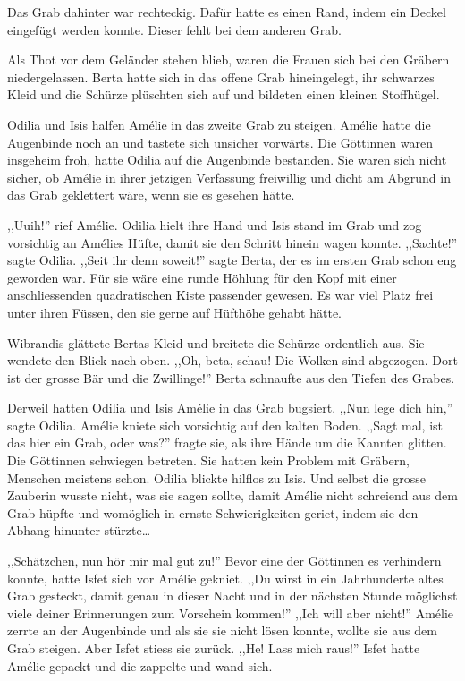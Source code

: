 \documentclass[11pt,titlepage,a5paper]{book}
\begin{document}
Das Grab dahinter war rechteckig. Dafür hatte es einen Rand, indem ein Deckel eingefügt werden konnte. Dieser fehlt bei dem anderen Grab.

Als Thot vor dem Geländer stehen blieb, waren die Frauen sich bei den Gräbern niedergelassen. Berta hatte sich in das offene Grab hineingelegt, ihr schwarzes Kleid und die Schürze plüschten sich auf und bildeten einen kleinen Stoffhügel.

Odilia und Isis halfen Amélie in das zweite Grab zu steigen. Amélie hatte die Augenbinde noch an und tastete sich unsicher vorwärts. Die Göttinnen waren insgeheim froh, hatte Odilia auf die Augenbinde bestanden. Sie waren sich nicht sicher, ob Amélie in ihrer jetzigen Verfassung freiwillig und dicht am Abgrund in das Grab geklettert wäre, wenn sie es gesehen hätte.

,,Uuih!'' rief Amélie. Odilia hielt ihre Hand und Isis stand im Grab und zog vorsichtig an Amélies Hüfte, damit sie den Schritt hinein wagen konnte. ,,Sachte!'' sagte Odilia. ,,Seit ihr denn soweit!'' sagte Berta, der es im ersten Grab schon eng geworden war. Für sie wäre eine runde Höhlung für den Kopf mit einer anschliessenden quadratischen Kiste passender gewesen. Es war viel Platz frei unter ihren Füssen, den sie gerne auf Hüfthöhe gehabt hätte.

Wibrandis glättete Bertas Kleid und breitete die Schürze ordentlich aus. Sie wendete den Blick nach oben. ,,Oh, beta, schau! Die Wolken sind abgezogen. Dort ist der grosse Bär und die Zwillinge!'' Berta schnaufte aus den Tiefen des Grabes.

Derweil hatten Odilia und Isis Amélie in das Grab bugsiert. ,,Nun lege dich hin,'' sagte Odilia. Amélie kniete sich vorsichtig auf den kalten Boden. ,,Sagt mal, ist das hier ein Grab, oder was?'' fragte sie, als ihre Hände um die Kannten glitten. Die Göttinnen schwiegen betreten. Sie hatten kein Problem mit Gräbern, Menschen meistens schon. Odilia blickte hilflos zu Isis. Und selbst die grosse Zauberin wusste nicht, was sie sagen sollte, damit Amélie nicht schreiend aus dem Grab hüpfte und womöglich in ernste Schwierigkeiten geriet, indem sie den Abhang hinunter stürzte\dots

,,Schätzchen, nun hör mir mal gut zu!'' Bevor eine der Göttinnen es verhindern konnte, hatte Isfet sich vor Amélie gekniet. ,,Du wirst in ein Jahrhunderte altes Grab gesteckt, damit genau in dieser Nacht und in der nächsten Stunde möglichst viele deiner Erinnerungen zum Vorschein kommen!'' ,,Ich will aber nicht!'' Amélie zerrte an der Augenbinde und als sie sie nicht lösen konnte, wollte sie aus dem Grab steigen. Aber Isfet stiess sie zurück. ,,He! Lass mich raus!'' Isfet hatte Amélie gepackt und die zappelte und wand sich.
\end{document}
